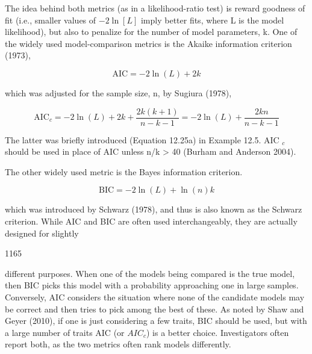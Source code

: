 \documentclass{article}
\begin{document}
The idea behind both metrics (as in a likelihood-ratio test) is reward goodness of fit (i.e., smaller values of  $ -2 \ln[L] $ imply better fits, where L is the model likelihood), but also to penalize for the number of model parameters, k. One of the widely used model-comparison metrics is the Akaike information criterion (1973),

\begin{equation}
\mathrm{AIC}=-2\ln(L)+2k
\end{equation}

which was adjusted for the sample size, n, by Sugiura (1978),

\begin{equation}
\mathrm{AIC}_{c}=-2\ln(L)+2k+\frac{2k(k+1)}{n-k-1}=-2\ln(L)+\frac{2kn}{n-k-1}
\end{equation}

The latter was briefly introduced (Equation 12.25a) in Example 12.5. AIC $ _{c} $ should be used in place of AIC unless n/k > 40 (Burham and Anderson 2004).

The other widely used metric is the Bayes information criterion.

\begin{equation}
\mathrm{BIC}=-2\ln(L)+\ln(n)k
\end{equation}

which was introduced by Schwarz (1978), and thus is also known as the Schwarz criterion. While AIC and BIC are often used interchangeably, they are actually designed for slightly

1165

different purposes. When one of the models being compared is the true model, then BIC picks this model with a probability approaching one in large samples. Conversely, AIC considers the situation where none of the candidate models may be correct and then tries to pick among the best of these. As noted by Shaw and Geyer (2010), if one is just considering a few traits, BIC should be used, but with a large number of traits AIC (or  $ AIC_{c} $) is a better choice. Investigators often report both, as the two metrics often rank models differently.
\end{document}
